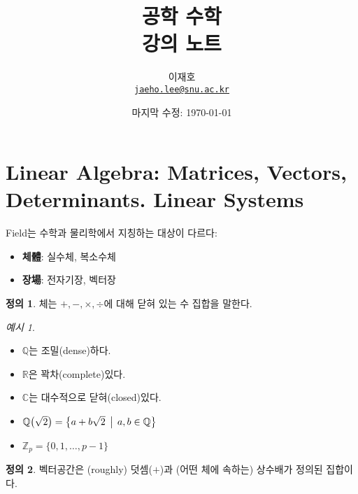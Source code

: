 \documentclass[unfonts,oneside,a4paper]{oblivoir}
\title{공학 수학\\강의 노트}
\author{이재호\\\href{mailto:jaeho.lee@snu.ac.kr}{\texttt{jaeho.lee@snu.ac.kr}}}
\date{마지막 수정: \today}
\theoremstyle{definition}
\newtheorem{definition}{정의}[section]
\theoremstyle{theorem}
\theoremstyle{theorem}
\theoremstyle{remark}
\theoremstyle{remark}
\theoremstyle{remark}
\newtheorem*{example}{예시}
\theoremstyle{remark}
\begin{document}
\maketitle

\setcounter{section}{6}
\reversemarginpar{}
\section{Linear Algebra: Matrices, Vectors, Determinants. Linear Systems}

Field는 수학과 물리학에서 지칭하는 대상이 다르다:
\begin{itemize}
    \item \textbf{체體}: 실수체, 복소수체
    \item \textbf{장場}: 전자기장, 벡터장
\end{itemize}

\begin{definition}
    체는 $+, -, \times, \div$에 대해 닫혀 있는 수 집합을 말한다.
\end{definition}

\begin{example}
    \leavevmode
    \begin{itemize}
        \item $\mathbb Q$는 조밀(dense)하다.
        \item $\mathbb R$은 꽉차(complete)있다.
        \item $\mathbb C$는 대수적으로 닫혀(closed)있다.
        \item $\mathbb Q \bigl(\sqrt 2\bigr) = \bigl\{a + b \sqrt 2\,\bigm|\,a, b \in \mathbb Q\bigr\}$
        \item $\mathbb Z_p = \{0, 1, \dots, p - 1\}$
    \end{itemize}
\end{example}

\begin{definition}
    벡터공간은 (roughly) 덧셈($+$)과 (어떤 체에 속하는) 상수배가 정의된 집합이다.
\end{definition}
\end{document}
